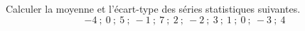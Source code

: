 \begin{exo}
	Calculer la moyenne et l'écart-type des séries statistiques suivantes.
	\[
		-4 \ ; \ 0 \ ; \ 5 \ ; \ -1 \ ; \ 7 \ ; \ 2 \ ; \ -2 \ ; \ 3 \ ; \ 1 \ ; \ 0 \ ; \ -3 \ ; \ 4
	\]
\end{exo}

